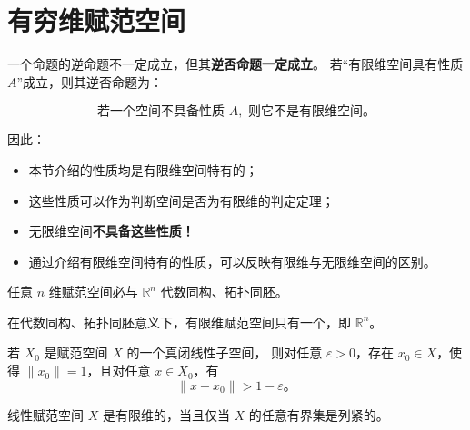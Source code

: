 \section{有穷维赋范空间}
\begin{remark}[有限维与无限维空间的区别]
一个命题的逆命题不一定成立，但其\textbf{逆否命题一定成立}。  
若“有限维空间具有性质 \(A\)”成立，则其逆否命题为：

\[
\text{若一个空间不具备性质 }A,\text{ 则它不是有限维空间。}
\]

因此：

\begin{itemize}
  \item 本节介绍的性质均是有限维空间特有的；
  \item 这些性质可以作为判断空间是否为有限维的判定定理；
  \item 无限维空间\textbf{不具备这些性质！}
  \item 通过介绍有限维空间特有的性质，可以反映有限维与无限维空间的区别。
\end{itemize}
\end{remark}
\begin{theorem}[同胚]
任意 \(n\) 维赋范空间必与 \(\mathbb{R}^n\) 代数同构、拓扑同胚。

在代数同构、拓扑同胚意义下，有限维赋范空间只有一个，即 \(\mathbb{R}^n\)。
\end{theorem}
\begin{lemma}[F. Riesz 引理]
若 \(X_0\) 是赋范空间 \(X\) 的一个真闭线性子空间，  
则对任意 \(\varepsilon>0\)，存在 \(x_0\in X\)，使得 \(\|x_0\|=1\)，且对任意 \(x\in X_0\)，有
\[
\|x - x_0\| > 1 - \varepsilon。
\]
\end{lemma}
\begin{theorem}
线性赋范空间 \(X\) 是有限维的，当且仅当 \(X\) 的任意有界集是列紧的。
\end{theorem}